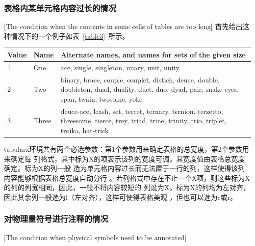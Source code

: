 \subsubsection{表格内某单元格内容过长的情况}[The condition when the contents in
  some cells of tables are too long]
首先给出这种情况下的一个例子如表~\ref{table3}~所示。
\begin{table}[htbp]
  \centering
  \vspace{0.5em}\wuhao
  \begin{tabularx}{0.7\textwidth}{llX}
    \toprule[1.5pt]
    Value & Name  & Alternate names, and names for sets of the given size                                                                                           \\\midrule[1pt]
    1     & One   & ace, single, singleton, unary, unit, unity                                                                                                      \\
    2     & Two   & binary, brace, couple, couplet, distich, deuce, double, doubleton, duad, duality, duet, duo, dyad, pair, snake eyes, span, twain, twosome, yoke \\
    3     & Three & deuce-ace, leash, set, tercet, ternary, ternion, terzetto, threesome, tierce, trey, triad, trine, trinity, trio, triplet, troika, hat-trick     \\\bottomrule[1.5pt]
  \end{tabularx}
\end{table}
tabularx环境共有两个必选参数：第1个参数用来确定表格的总宽度，第2个参数用来确定每
列格式，其中标为X的项表示该列的宽度可调，其宽度值由表格总宽度确定。标为X的列一般
选为单元格内容过长而无法置于一行的列，这样使得该列内容能够根据表格总宽度自动分行
。若列格式中存在不止一个X项，则这些标为X的列的列宽相同，因此，一般不将内容较短的
列设为X。标为X的列均为左对齐，因此其余列一般选为l（左对齐），这样可使得表格美观
，但也可以选为c或r。

\subsubsection{对物理量符号进行注释的情况}[The condition when physical symbols
  need to be annotated]

